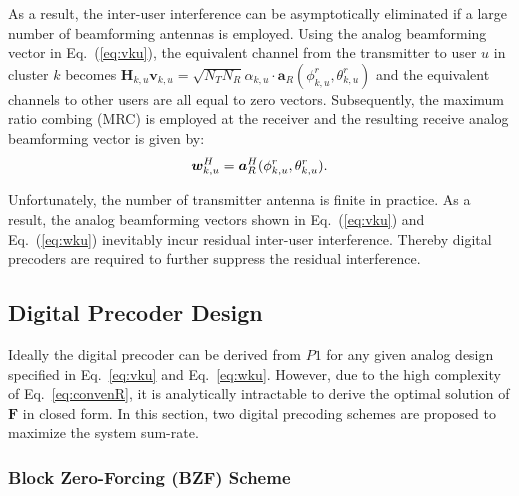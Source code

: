 \documentclass[conference]{IEEEtran}
\begin{document}
{As a result, the inter-user interference can be asymptotically eliminated if a large number of beamforming antennas is employed. Using the analog beamforming vector in Eq.~(\ref{eq:vku}), the equivalent channel from the transmitter to user $u$ in cluster $k$ becomes $\bm{H}_{k,u}\bm{v}_{k,u}=\sqrt{N_{T}N_{R}}\alpha_{k,u}\cdot \bm{a}_{R}(\phi^r_{k,u},\theta^r_{k,u})$ and the equivalent channels to other users are all equal to zero vectors. Subsequently, the maximum ratio combing (MRC) is employed at the receiver and the resulting receive analog beamforming vector is given by:
\begin{equation}
\bm{w}^H_{k,u}=\bm{a}_{R}^{H}(\phi^r_{k,u},\theta^r_{k,u}).\\
\label{eq:wku}
\end{equation}

Unfortunately, the number of transmitter antenna is finite in practice. As a result, the analog beamforming vectors shown in Eq.~(\ref{eq:vku}) and Eq.~(\ref{eq:wku}) inevitably incur residual inter-user interference. Thereby digital precoders are required to further suppress the residual interference.

\subsection{Digital Precoder Design}\label{digital}
Ideally the digital precoder can be derived from $P1$ for any given analog design specified in Eq.~\eqref{eq:vku} and Eq.~\eqref{eq:wku}.
However, due to the high complexity of Eq.~\eqref{eq:convenR}, it is analytically intractable to derive the optimal solution of $\bm F$ in closed form. In this section, two digital precoding schemes are proposed to maximize the system sum-rate.

\subsubsection{Block Zero-Forcing (BZF) Scheme}

}
\end{document}
